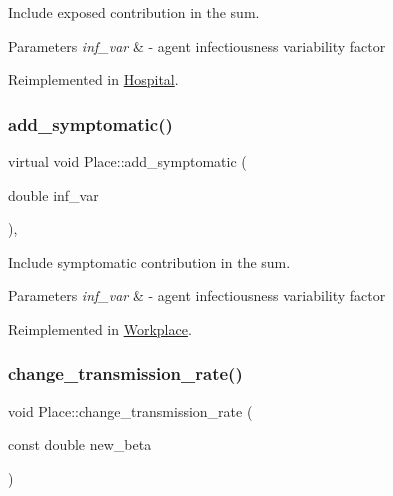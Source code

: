 Include exposed contribution in the sum. 


\begin{DoxyParams}{Parameters}
{\em inf\+\_\+var} & -\/ agent infectiousness variability factor \\
\hline
\end{DoxyParams}


Reimplemented in \hyperlink{classHospital_a55c2f778b4aeb0f775bb1b45c147c7b8}{Hospital}.

\mbox{\label{classPlace_a5216539c8589d41aad430513740fa15c}} 
\subsubsection{\texorpdfstring{add\+\_\+symptomatic()}{add\_symptomatic()}}
{\footnotesize\ttfamily virtual void Place\+::add\+\_\+symptomatic (\begin{DoxyParamCaption}\item[{double}]{inf\+\_\+var }\end{DoxyParamCaption})\hspace{0.3cm}{\ttfamily [inline]}, {\ttfamily [virtual]}}



Include symptomatic contribution in the sum. 


\begin{DoxyParams}{Parameters}
{\em inf\+\_\+var} & -\/ agent infectiousness variability factor \\
\hline
\end{DoxyParams}


Reimplemented in \hyperlink{classWorkplace_a48ef6cf8af0753240063ea8c00f4cc63}{Workplace}.

\mbox{\label{classPlace_a59594ed1acf114ba3a123bd99d874b65}} 
\subsubsection{\texorpdfstring{change\+\_\+transmission\+\_\+rate()}{change\_transmission\_rate()}}
{\footnotesize\ttfamily void Place\+::change\+\_\+transmission\+\_\+rate (\begin{DoxyParamCaption}\item[{const double}]{new\+\_\+beta }\end{DoxyParamCaption})\hspace{0.3cm}{\ttfamily [inline]}}

